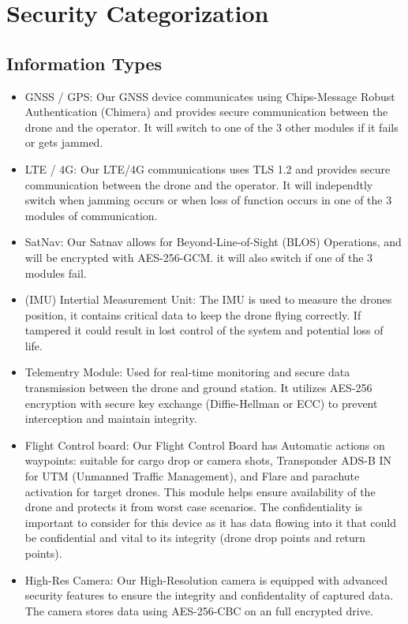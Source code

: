 \documentclass{article}
\begin{document}
\section{Security Categorization}

\subsection{Information Types}

\begin{itemize}
    \item GNSS / GPS: Our GNSS device communicates using Chips-Message Robust Authentication (Chimera) and provides secure communication between the drone and the operator. It will switch to one of the 3 other modules if it fails or gets jammed.
    \item LTE / 4G: Our LTE/4G communications uses TLS 1.2 and provides secure communication between the drone and the operator. It will independtly switch when jamming occurs or when loss of function occurs in one of the 3 modules of communication.
    \item SatNav:  Our Satnav allows for Beyond-Line-of-Sight (BLOS) Operations, and will be encrypted with AES-256-GCM. it will also switch if one of the 3 modules fail.
    \item (IMU) Intertial Measurement Unit: The IMU is used to measure the drones position, it contains critical data to keep the drone flying correctly. If tampered it could result in lost control of the system and potential loss of life.
    \item Telementry Module: Used for real-time monitoring and secure data transmission between the drone and ground station. It utilizes AES-256 encryption with secure key exchange (Diffie-Hellman or ECC) to prevent interception and maintain integrity.
    \item Flight Control board: Our Flight Control Board has Automatic actions on waypoints: suitable for cargo drop or camera shots, Transponder ADS-B IN for UTM (Unmanned Traffic Management),  and Flare and parachute activation for target drones. This module helps ensure availability of the drone and protects it from worst case scenarios. The confidentiality is important to consider for this device as it has data flowing into it that could be confidential and vital to its integrity (drone drop points and return points).
    \item High-Res Camera: Our High-Resolution camera is equipped with advanced security features to ensure the integrity and confidentality of captured data. The camera stores data using AES-256-CBC on an full encrypted drive.

\end{itemize}
\end{document}
